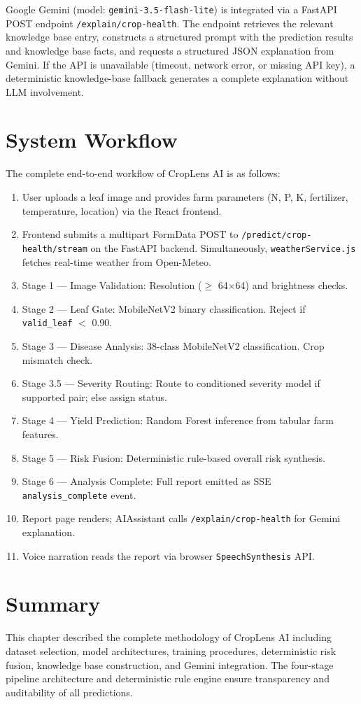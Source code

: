 Google Gemini (model: \texttt{gemini-3.5-flash-lite}) is integrated via a FastAPI POST endpoint \texttt{/explain/crop-health}. The endpoint retrieves the relevant knowledge base entry, constructs a structured prompt with the prediction results and knowledge base facts, and requests a structured JSON explanation from Gemini. If the API is unavailable (timeout, network error, or missing API key), a deterministic knowledge-base fallback generates a complete explanation without LLM involvement.

\section{System Workflow}

The complete end-to-end workflow of CropLens AI is as follows:
\begin{enumerate}
    \item User uploads a leaf image and provides farm parameters (N, P, K, fertilizer, temperature, location) via the React frontend.
    \item Frontend submits a multipart FormData POST to \texttt{/predict/crop-health/stream} on the FastAPI backend. Simultaneously, \texttt{weatherService.js} fetches real-time weather from Open-Meteo.
    \item Stage 1 --- Image Validation: Resolution ($\geq$ 64$\times$64) and brightness checks.
    \item Stage 2 --- Leaf Gate: MobileNetV2 binary classification. Reject if \texttt{valid\_leaf} $<$ 0.90.
    \item Stage 3 --- Disease Analysis: 38-class MobileNetV2 classification. Crop mismatch check.
    \item Stage 3.5 --- Severity Routing: Route to conditioned severity model if supported pair; else assign status.
    \item Stage 4 --- Yield Prediction: Random Forest inference from tabular farm features.
    \item Stage 5 --- Risk Fusion: Deterministic rule-based overall risk synthesis.
    \item Stage 6 --- Analysis Complete: Full report emitted as SSE \texttt{analysis\_complete} event.
    \item Report page renders; AIAssistant calls \texttt{/explain/crop-health} for Gemini explanation.
    \item Voice narration reads the report via browser \texttt{SpeechSynthesis} API.
\end{enumerate}

\section{Summary}

This chapter described the complete methodology of CropLens AI including dataset selection, model architectures, training procedures, deterministic risk fusion, knowledge base construction, and Gemini integration. The four-stage pipeline architecture and deterministic rule engine ensure transparency and auditability of all predictions.
